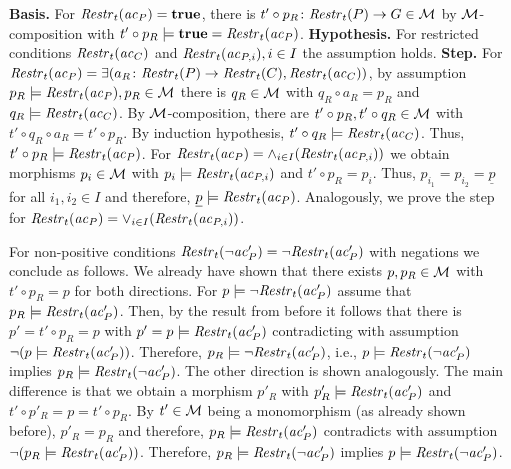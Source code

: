\begin{enumerate}
  \textbf{Basis.} For $\mathit{Restr}_t(\mathit{ac}_P)=\textbf{true}$, there is $t' \circ p_R\colon \mathit{Restr}_t(P) \to G \in {\cal M}$ by ${\cal M}$-composition with $t' \circ p_R \models \textbf{true}=\mathit{Restr}_t(\mathit{ac}_P)$.
  \textbf{Hypothesis.} For restricted conditions $\mathit{Restr}_t(\mathit{ac}_C)$ and $\mathit{Restr}_t(\mathit{ac}_{P,i}),i \in I$ the assumption holds.
  \textbf{Step.} For $\mathit{Restr}_t(\mathit{ac}_P)=\exists(a_R\colon \mathit{Restr}_t(P) \to \mathit{Restr}_t(C),\mathit{Restr}_t(\mathit{ac}_C))$, by assumption $p_R \models \mathit{Restr}_t(\mathit{ac}_P),p_R \in {\cal M}$ there is $q_R \in {\cal M}$ with $q_R \circ a_R=p_R$ and $q_R \models \mathit{Restr}_t(\mathit{ac}_C)$.
  By ${\cal M}$-composition, there are $t' \circ p_R,t' \circ q_R \in {\cal M}$ with $t' \circ q_R \circ a_R=t' \circ p_R$.
  By induction hypothesis, $t' \circ q_R \models \mathit{Restr}_t(\mathit{ac}_C)$.
  Thus, $t' \circ p_R \models \mathit{Restr}_t(\mathit{ac}_P)$.
  For $\mathit{Restr}_t(\mathit{ac}_P)=\wedge_{i \in I}(\mathit{Restr}_t(\mathit{ac}_{P,i}))$ we obtain morphisms $p_i \in {\cal M}$ with $p_i \models \mathit{Restr}_t(\mathit{ac}_{P,i})$ and $t' \circ p_R=p_i$.
  Thus, $p_{i_1}=p_{i_2}=\underline{p}$ for all $i_1,i_2 \in I$ and therefore, $\underline{p} \models \mathit{Restr}_t(\mathit{ac}_P)$.
  Analogously, we prove the step for $\mathit{Restr}_t(\mathit{ac}_P)=\vee_{i \in I}(\mathit{Restr}_t(\mathit{ac}_{P,i}))$.
\end{enumerate}
For non-positive conditions $\mathit{Restr}_t(\neg \mathit{ac}'_P)=\neg \mathit{Restr}_t(\mathit{ac}'_P)$ with negations we conclude as follows.
We already have shown that there exists $p,p_R \in {\cal M}$ with $t' \circ p_R=p$ for both directions.
For $p \models \neg \mathit{Restr}_t(\mathit{ac}'_P)$ assume that $p_R \models \mathit{Restr}_t(\mathit{ac}'_P)$.
Then, by the result from before it follows that there is $p'=t' \circ p_R=p$ with $p'=p \models \mathit{Restr}_t(\mathit{ac}'_P)$ contradicting with assumption $\neg(p \models \mathit{Restr}_t(\mathit{ac}'_P))$.
Therefore, $p_R \models \neg \mathit{Restr}_t(\mathit{ac}'_P)$, i.e., $p \models \mathit{Restr}_t(\neg\mathit{ac}'_P)$ implies $p_R \models \mathit{Restr}_t(\neg\mathit{ac}'_P)$.
The other direction is shown analogously.
The main difference is that we obtain a morphism $p'_R$ with $p'_R \models \mathit{Restr}_t(\mathit{ac}'_P)$ and $t' \circ p'_R=p=t' \circ p_R$.
By $t' \in {\cal M}$ being a monomorphism (as already shown before), $p'_R=p_R$ and therefore, $p_R \models \mathit{Restr}_t(\mathit{ac}'_P)$ contradicts with assumption $\neg(p_R \models \mathit{Restr}_t(\mathit{ac}'_P))$.
Therefore, $p_R \models \mathit{Restr}_t(\neg\mathit{ac}'_P)$ implies $p \models \mathit{Restr}_t(\neg\mathit{ac}'_P)$.

